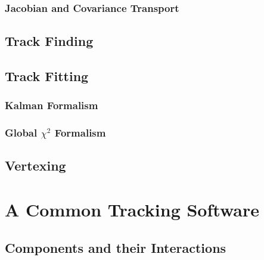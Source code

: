 
\subsubsection{Jacobian and Covariance Transport}


\subsection{Track Finding}


\subsection{Track Fitting}


\subsubsection{Kalman Formalism}


\subsubsection{Global $\chi^2$ Formalism}


\subsection{Vertexing}


\section{A Common Tracking Software}


\subsection{Components and their Interactions}

